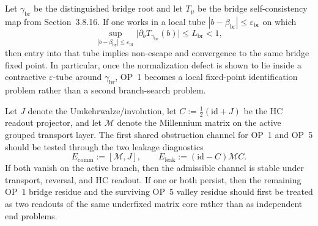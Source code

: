 \begin{description}[leftmargin=2.2em, labelindent=0pt, itemsep=0.5em]
 \item[OP~1 epsilon-bridge tool.] Let \(\gamma_{\mathrm{br}}\) be the distinguished bridge root and let \(T_\mu\) be the bridge self-consistency map from Section~3.8.16. If one works in a local tube \(|b-\beta_{\mathrm{br}}|\le \varepsilon_{\mathrm{br}}\) on which
 \[
 \sup_{|b-\beta_{\mathrm{br}}|\le \varepsilon_{\mathrm{br}}}\bigl|\partial_b T_{\gamma_{\mathrm{br}}}(b)\bigr|\le L_{\mathrm{br}}<1,
 \]
 then entry into that tube implies non-escape and convergence to the same bridge fixed point. In particular, once the normalization defect is shown to lie inside a contractive \(\varepsilon\)-tube around \(\gamma_{\mathrm{br}}\), OP~1 becomes a local fixed-point identification problem rather than a second branch-search problem.
 \item[Shared matrix-leakage tool.] Let \(J\) denote the Umkehrwalze/involution, let \(C:=\tfrac12(\mathrm{id}+J)\) be the HC readout projector, and let \(\mathcal M\) denote the Millennium matrix on the active grouped transport layer. The first shared obstruction channel for OP~1 and OP~5 should be tested through the two leakage diagnostics
 \[
 E_{\mathrm{comm}}:=[\mathcal M,J],
 \qquad
 E_{\mathrm{leak}}:=(\mathrm{id}-C)\mathcal M C.
 \]
 If both vanish on the active branch, then the admissible channel is stable under transport, reversal, and HC readout. If one or both persist, then the remaining OP~1 bridge residue and the surviving OP~5 valley residue should first be treated as two readouts of the same underfixed matrix core rather than as independent end problems.


\end{description}
